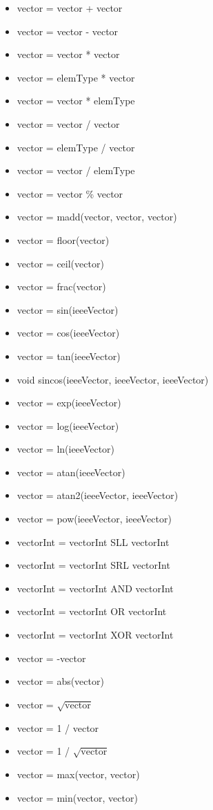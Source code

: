 \documentclass[11pt]{amsart}
\begin{document}
\begin{itemize}
\item vector = vector + vector
\item vector = vector - vector
\item vector = vector * vector
\item vector = elemType * vector
\item vector = vector * elemType
\item vector = vector / vector
\item vector = elemType / vector
\item vector = vector / elemType
\item vector = vector \% vector
\item vector = madd(vector, vector, vector)
\item vector = floor(vector)
\item vector = ceil(vector)
\item vector = frac(vector)
\item vector = sin(ieeeVector)
\item vector = cos(ieeeVector)
\item vector = tan(ieeeVector)
\item void sincos(ieeeVector, ieeeVector, ieeeVector)
\item vector = exp(ieeeVector)
\item vector = log(ieeeVector)
\item vector = ln(ieeeVector)
\item vector = atan(ieeeVector)
\item vector = atan2(ieeeVector, ieeeVector)
\item vector = pow(ieeeVector, ieeeVector)
\item vectorInt = vectorInt SLL vectorInt
\item vectorInt = vectorInt SRL vectorInt
\item vectorInt = vectorInt AND vectorInt
\item vectorInt = vectorInt OR vectorInt
\item vectorInt = vectorInt XOR vectorInt
\item vector = -vector
\item vector = abs(vector)
\item vector = $\sqrt{\text{vector}}$
\item vector = 1 / vector
\item vector = 1 / $\sqrt{\text{vector}}$
\item vector = max(vector, vector) 
\item vector = min(vector, vector)

\end{itemize}
\end{document}

